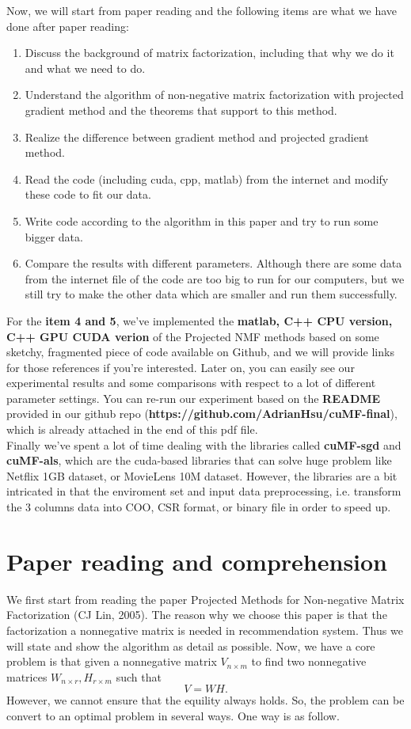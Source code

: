 \documentclass[12pt]{article}
\theoremstyle{remark}
\begin{document}
\begin{CJK}{UTF8}{bsmi}
Now, we will start from paper reading and the following items are what we have done after paper reading:
\begin{enumerate}
\item Discuss the background of matrix factorization, including that why we do it and what we need to do.
\item Understand the algorithm of non-negative matrix factorization with projected gradient method and the theorems that support to this method.
\item Realize the difference between gradient method and projected gradient method.
\item Read the code (including cuda, cpp, matlab) from the internet and modify these code to fit our data.
\item Write code according to the algorithm in this paper and try to run some bigger data.
\item Compare the results with different parameters. Although there are some data from the internet file of the code are too big to run for our computers, but we still try to make the other data which are smaller and run them successfully.
\end{enumerate}
For the \textbf{item 4 and 5}, we've implemented the \textbf{matlab, C++ CPU version, C++ GPU CUDA verion} of the Projected NMF methods based on some sketchy, fragmented piece of code available on Github, and we will provide links for those references if you're interested. Later on, you can easily see our experimental results and some comparisons with respect to a lot of different parameter settings. You can re-run our experiment based on the \textbf{README} provided in our github repo (\textbf{https://github.com/AdrianHsu/cuMF-final}), which is already attached in the end of this pdf file.\\
Finally we've spent a lot of time dealing with the libraries called \textbf{cuMF-sgd} and \textbf{cuMF-als}, which are the cuda-based libraries that can solve huge problem like Netflix 1GB dataset, or MovieLens 10M dataset. However, the libraries are a bit intricated in that the enviroment set and input data preprocessing, i.e. transform the 3 columns data into COO, CSR format, or binary file in order to speed up.
 \section{Paper reading and comprehension}
We first start from reading the paper Projected Methods for Non-negative Matrix Factorization (CJ Lin, 2005). The reason why we choose this paper is that the factorization a nonnegative matrix is needed in recommendation system. Thus we will state and show the algorithm as detail as possible. Now, we have a core problem is that given a nonnegative matrix $V_{n\times m}$ to find two nonnegative matrices $W_{n \times r},H_{r \times m}$ such that 
$$V=WH.$$ 
However, we cannot ensure that the equility always holds. So, the problem can be convert to an optimal problem in several ways. One way is as follow. 

\end{CJK}
\end{document}
